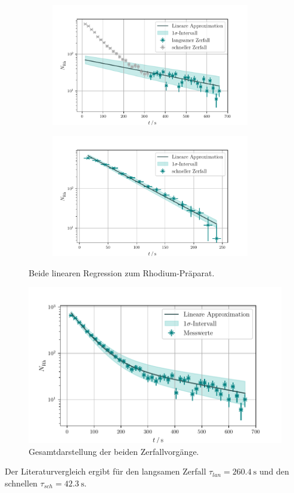 \begin{figure}
    \begin{subfigure}{0.5\textwidth}
        \includegraphics[width=0.95\textwidth]{plots/Rhodium_langsam.pdf}
    \end{subfigure}
    \begin{subfigure}{0.5\textwidth}
        \includegraphics[width=0.95\textwidth]{plots/Rhodium_schnell.pdf}
    \end{subfigure}
    \caption{Beide linearen Regression zum Rhodium-Präparat.}
    \label{fig:RHlin}
\end{figure}
\begin{figure}
    \centering
    \includegraphics[width=\textwidth]{python/Rhodium_kombi.pdf}
    \caption{Gesamtdarstellung der beiden Zerfallvorgänge.}
    \label{fig:Rhodium_kombi}
\end{figure}

Der Literaturvergleich\cite{RhIsotopes} ergibt für den langsamen Zerfall $\tau_{lan} = \SI{260.4}{\second}$ und den schnellen $\tau_{sch} = \SI{42.3}{\second}$.